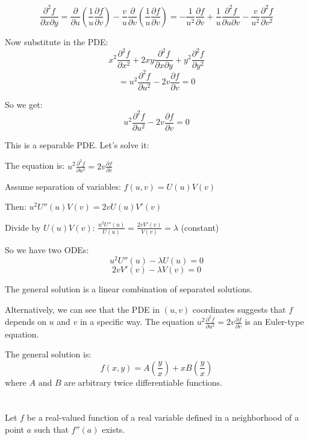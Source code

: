 \documentclass[12pt]{article}
\begin{document}
\begin{correctionbox}
$$\frac{\partial^2 f}{\partial x \partial y} = \frac{\partial}{\partial u}\left(\frac{1}{u}\frac{\partial f}{\partial v}\right) - \frac{v}{u}\frac{\partial}{\partial v}\left(\frac{1}{u}\frac{\partial f}{\partial v}\right) = -\frac{1}{u^2}\frac{\partial f}{\partial v} + \frac{1}{u}\frac{\partial^2 f}{\partial u \partial v} - \frac{v}{u^2}\frac{\partial^2 f}{\partial v^2}$$

Now substitute in the PDE:
$$x^2\frac{\partial^2 f}{\partial x^2} + 2xy\frac{\partial^2 f}{\partial x \partial y} + y^2\frac{\partial^2 f}{\partial y^2}$$
$$= u^2\frac{\partial^2 f}{\partial u^2} - 2v\frac{\partial f}{\partial v} = 0$$

So we get:
$$u^2\frac{\partial^2 f}{\partial u^2} - 2v\frac{\partial f}{\partial v} = 0$$

This is a separable PDE. Let's solve it:

The equation is: $u^2\frac{\partial^2 f}{\partial u^2} = 2v\frac{\partial f}{\partial v}$

Assume separation of variables: $f(u,v) = U(u)V(v)$

Then: $u^2U''(u)V(v) = 2vU(u)V'(v)$

Divide by $U(u)V(v)$: $\frac{u^2U''(u)}{U(u)} = \frac{2vV'(v)}{V(v)} = \lambda$ (constant)

So we have two ODEs:
$$u^2U''(u) - \lambda U(u) = 0$$
$$2vV'(v) - \lambda V(v) = 0$$

The general solution is a linear combination of separated solutions.

Alternatively, we can see that the PDE in $(u,v)$ coordinates suggests that $f$ depends on $u$ and $v$ in a specific way. The equation $u^2\frac{\partial^2 f}{\partial u^2} = 2v\frac{\partial f}{\partial v}$ is an Euler-type equation.

The general solution is:
$$f(x,y) = A\left(\frac{y}{x}\right) + xB\left(\frac{y}{x}\right)$$
where $A$ and $B$ are arbitrary twice differentiable functions.
\end{correctionbox}

\section{}
Let $f$ be a real-valued function of a real variable defined in a neighborhood of a point $a$ such that $f''(a)$ exists.
\end{document}
